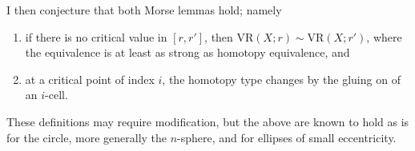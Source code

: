 \documentclass[11pt]{amsart}
\newcommand{\vr}[2]{\mathrm{VR}(#1;#2)}
\begin{document}
I then conjecture that both Morse lemmas hold; namely
\begin{enumerate}[label=(\alph*)]
\item if there is no critical value in $[r,r']$, then $\vr{X}{r} \sim \vr{X}{r'}$, where the equivalence is at least as strong as homotopy equivalence, and
\item at a critical point of index $i$, the homotopy type changes by the gluing on of an $i$-cell.
\end{enumerate}
These definitions may require modification, but the above are known to hold as is for the circle, more generally the $n$-sphere, and for ellipses of small eccentricity.



\end{document}
